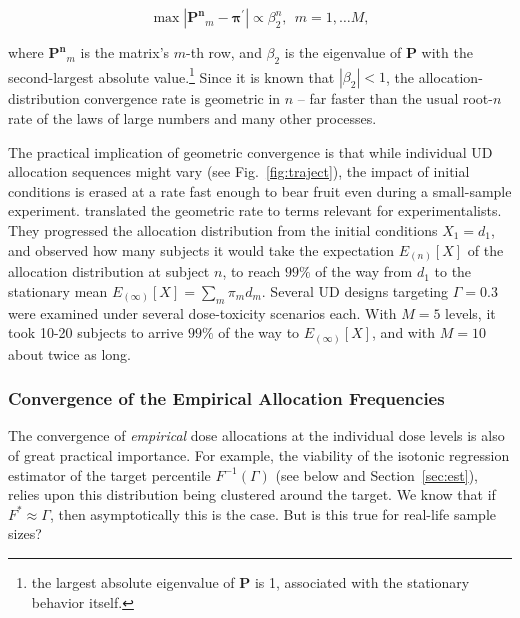 \begin{equation}\label{eq:diac}
\max\left|\mathbf{P^n}_{m}-\boldsymbol{\pi}^\prime\right|\propto\beta_2^n,\ \ m=1,\ldots M,
\end{equation}

\noindent where $\mathbf{P^n}_{m}$ is the matrix's $m$-th row, and $\beta_2$ is the eigenvalue of $\mathbf{P}$ with the second-largest absolute value.\footnote{
the largest absolute eigenvalue of $\mathbf{P}$ is 1, associated with the stationary behavior itself.} Since it is known that $\left|\beta_2\right|<1$, the allocation-distribution convergence rate is geometric in $n$ --  far faster than the usual root-$n$ rate of the laws of large numbers and many other processes.

The practical implication of geometric convergence is that while individual UD allocation sequences might vary (see Fig.~\ref{fig:traject}), the impact of initial conditions is erased at a rate fast enough to bear fruit even during a small-sample experiment. \cite{Oron:Hoff:thek:2009} translated the geometric rate to terms relevant for experimentalists. They progressed the allocation distribution from the initial conditions $X_1=d_1$, and observed how many subjects it would take the expectation $E_{(n)}[X]$ of the allocation distribution at subject $n$,  to reach $99\%$ of the way from $d_1$ to the stationary mean $E_{(\infty)}[X]=\sum_m \pi_m d_m$. Several UD designs targeting $\Gamma=0.3$ were examined under several dose-toxicity scenarios each. With $M=5$ levels, it took 10-20 subjects to arrive $99\%$ of the way to $E_{(\infty)}[X]$, and with $M=10$ about twice as long.

\subsubsection{Convergence of the Empirical Allocation Frequencies}\label{sec:asymvar}

The convergence of \emph{empirical} dose allocations at the individual dose levels is also of great practical importance. For example, the viability of the isotonic regression estimator of the target percentile $F^{-1}(\Gamma)$ (see below and Section~\ref{sec:est}), relies upon this distribution being clustered around the target. We know that if $F^*\approx\Gamma$, then asymptotically this is the case. But is this true for real-life sample sizes?


